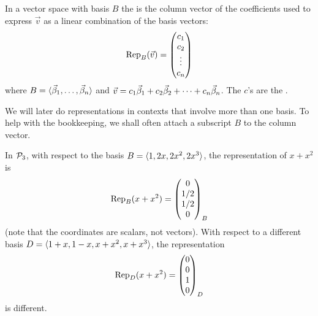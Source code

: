 \begin{definition}
\label{def:RepresentingVectors}
In a vector space with basis $B$
the %
 is
the column vector of the coefficients used to express $\vec{v}$ as a 
linear combination of the basis vectors:
\begin{equation*}
  \rep{\vec{v}}{B}
  =
  \colvec{c_1 \\ c_2 \\ \vdots \\ c_n}
\end{equation*}
where
\( B=\sequence{\vec{\beta}_1,\dots,\vec{\beta}_n} \) and 
\( \vec{v}=\lincombo{c}{\vec{\beta}} \).
The \( c \)'s are the
%
.
\end{definition}

We will later do representations in contexts that involve more than one basis.
To help with the bookkeeping, we shall often  
attach a subscript $B$ to the column vector.

\begin{example}
In \( \polyspace_3 \), with respect to the basis
\( B=\sequence{1,2x,2x^2,2x^3} \),
the representation of \( x+x^2 \) is
\begin{equation*}
  \rep{x+x^2}{B}=\colvec{0 \\ 1/2 \\ 1/2 \\ 0}_B
\end{equation*}
(note that the coordinates are scalars, not vectors).
With respect to a different basis \( D=\sequence{1+x,1-x,x+x^2,x+x^3} \),
the representation 
\begin{equation*}
  \rep{x+x^2}{D}=\colvec{0 \\ 0 \\ 1 \\ 0}_D
\end{equation*}
is different.
\end{example}

